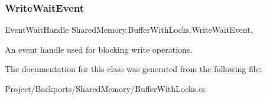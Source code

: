 \mbox{\label{class_shared_memory_1_1_buffer_with_locks_a5d7e21579a5af649e828e3a4e70f67e8}} 
\subsubsection{\texorpdfstring{Write\+Wait\+Event}{WriteWaitEvent}}
{\footnotesize\ttfamily Event\+Wait\+Handle Shared\+Memory.\+Buffer\+With\+Locks.\+Write\+Wait\+Event\hspace{0.3cm}{\ttfamily [get]}, {\ttfamily [protected]}}



An event handle used for blocking write operations. 



The documentation for this class was generated from the following file\+:\begin{DoxyCompactItemize}
\item 
Project/\+Backports/\+Shared\+Memory/Buffer\+With\+Locks.\+cs\end{DoxyCompactItemize}
